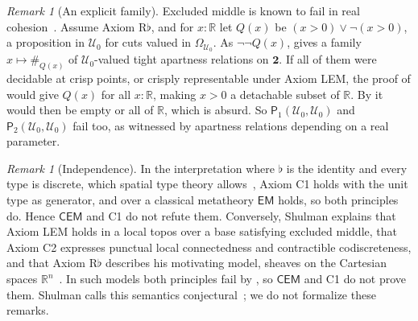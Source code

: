 \documentclass[11pt]{amsart}
\theoremstyle{definition}
\theoremstyle{remark}
\newtheorem{remark}[theorem]{Remark}
\newcommand{\Uz}{\mathcal U_0}
\newcommand{\B}{\mathbf 2}
\newcommand{\R}{\mathbb R}
\newcommand{\Om}{\Omega}
\newcommand{\EM}{\mathsf{EM}}
\newcommand{\CEM}{\mathsf{CEM}}
\newcommand{\Pone}{\mathsf P_1}
\newcommand{\Ptwo}{\mathsf P_2}
\newcommand{\apP}[1]{\mathrel{\#_{#1}}}
\begin{document}
\begin{remark}[An explicit family]\label{rem:family}
Excluded middle is known to fail in real
cohesion~\cite[\S8.3]{Shulman2018}. Assume Axiom R$\flat$, and for $x:\R$
let $Q(x)$ be $(x>0)\vee\neg(x>0)$, a proposition in $\Uz$ for cuts
valued in $\Om_{\Uz}$. As $\neg\neg Q(x)$,  gives a family
$x\mapsto{\apP{Q(x)}}$ of $\Uz$-valued tight apartness relations on $\B$.
If all of them were decidable at crisp points, or crisply representable
under Axiom LEM, the proof of  would give $Q(x)$ for all
$x:\R$, making $x>0$ a detachable subset of $\R$. By
\cite[Theorem~11.1]{Shulman2018} it would then be empty or all of $\R$,
which is absurd. So $\Pone(\Uz,\Uz)$ and $\Ptwo(\Uz,\Uz)$ fail too, as
witnessed by apartness relations depending on a real parameter.
\end{remark}

\begin{remark}[Independence]\label{rem:independence}
In the interpretation where $\flat$ is the identity and every type is
discrete, which spatial type theory allows~\cite[\S7]{Shulman2018},
Axiom C1 holds with the unit type as generator, and over a classical
metatheory $\EM$ holds, so both principles do. Hence $\CEM$ and C1 do
not refute them. Conversely, Shulman explains that Axiom LEM holds in a
local topos over a base satisfying excluded middle, that Axiom C2
expresses punctual local connectedness and contractible codiscreteness,
and that Axiom R$\flat$ describes his motivating model, sheaves on the
Cartesian spaces $\R^n$~\cite[\S\S7 and~10]{Shulman2018}. In such models
both principles fail by , so $\CEM$ and C1 do not prove
them. Shulman calls this semantics
conjectural~\cite[Remark~7.5]{Shulman2018}; we do not formalize these
remarks.
\end{remark}
\end{document}
